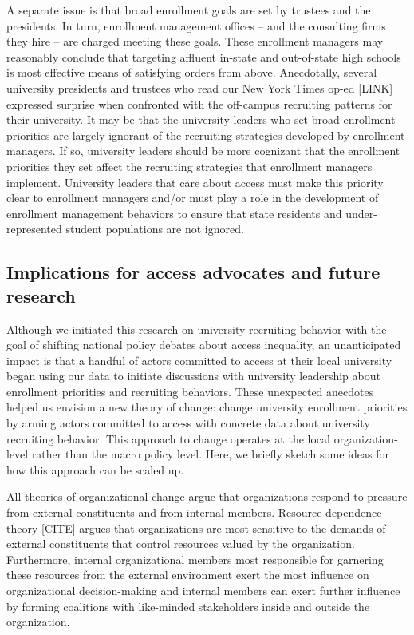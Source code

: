 \documentclass[twoside]{article}
\begin{document}
A separate issue is that broad enrollment goals are set by trustees and the presidents.  In turn, enrollment management offices -- and the consulting firms they hire -- are charged meeting these goals.  These enrollment managers may reasonably conclude that targeting affluent in-state and out-of-state high schools is most effective means of satisfying orders from above.  Anecdotally, several university presidents and trustees who read our New York Times op-ed [LINK] expressed surprise when confronted with the off-campus recruiting patterns for their university.  It may be that the university leaders who set broad enrollment priorities are largely ignorant of the recruiting strategies developed by enrollment managers.  If so, university leaders should be more cognizant that the enrollment priorities they set affect the recruiting strategies that enrollment managers implement.  University leaders that care about access must make this priority clear to enrollment managers and/or must play a role in the development of enrollment management behaviors to ensure that state residents and under-represented student populations are not ignored.

\subsection*{Implications for access advocates and future research}

Although we initiated this research on university recruiting behavior with the goal of shifting national policy debates about access inequality, an unanticipated impact is that a handful of actors committed to access at their local university began using our data to initiate discussions with university leadership about enrollment priorities and recruiting behaviors.  These unexpected anecdotes helped us envision a new theory of change: change university enrollment priorities by arming actors committed to access with concrete data about university recruiting behavior.  This approach to change operates at the local organization-level rather than the macro policy level. Here, we briefly sketch some ideas for how this approach can be scaled up.

All theories of organizational change argue that organizations respond to pressure from external constituents and from internal members.  Resource dependence theory [CITE] argues that organizations are most sensitive to the demands of external constituents that control resources valued by the organization.  Furthermore, internal organizational members most responsible for garnering these resources from the external environment exert the most influence on organizational decision-making and internal members can exert further influence by forming coalitions with like-minded stakeholders inside and outside the organization.
\end{document}
